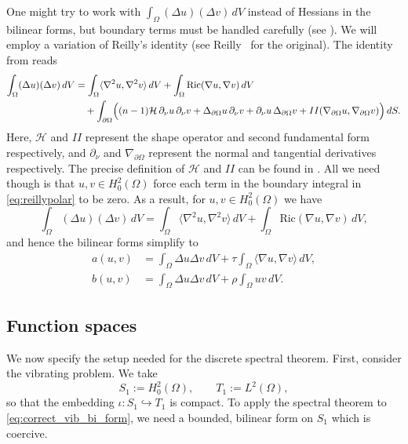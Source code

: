 \documentclass[11pt]{amsart}
\theoremstyle{definition}
\numberwithin{equation}{section}
\newcommand{\lapl}{\Delta}
\newcommand{\grad}{\nabla}
\begin{document}
One might try to work with $\int_{\Omega} (\Delta u)(\Delta v)\,dV$ instead of Hessians in the bilinear forms, but boundary terms must be handled carefully (see \cite[Remark 3.3]{CP22}). We will employ a variation of Reilly's identity (see Reilly~\cite{R77} for the original). The identity from \cite[Eq. 3.11]{CP22} reads
\begin{equation}\label{eq:reillypolar}
\begin{split}
\int_\Omega (\Delta u)(\Delta v)\,dV
&=
\int_\Omega \langle \nabla^2 u,\nabla^2 v\rangle\,dV
+\int_\Omega \text{Ric}(\nabla u,\nabla v)\,dV \\
&\quad
+\int_{\partial\Omega}
\Bigl(
(n-1)\mathcal{H}\,\partial_\nu u\,\partial_\nu v
+\Delta_{\partial\Omega}u\,\partial_\nu v
+\partial_\nu u\,\Delta_{\partial\Omega}v
+II(\nabla_{\partial\Omega}u,\nabla_{\partial\Omega}v)
\Bigr)\,dS.
\end{split}
\end{equation}
Here, $\mathcal{H}$ and $II$ represent the shape operator and second fundamental form respectively, and $\partial_\nu$ and $\grad_{\partial \Omega}$ represent the normal and tangential derivatives respectively. The precise definition of $\mathcal{H}$ and $II$ can be found in \cite{CP22}. All we need though is that $u,v \in H_0^2(\Omega)$ force each term in the boundary integral in \eqref{eq:reillypolar} to be zero. As a result, for $u ,v\in H_0^2(\Omega)$ we have
\[
\int_\Omega (\Delta u)(\Delta v)\,dV
=
\int_\Omega \langle \nabla^2 u,\nabla^2 v\rangle\,dV
+\int_\Omega \text{Ric}(\nabla u,\nabla v)\,dV,
\]
and hence the bilinear forms simplify to
\begin{align}
a(u,v)
&= \int_{\Omega} \lapl u \lapl v \, dV
   + \tau\int_{\Omega} \langle \nabla u,\nabla v\rangle \, dV, \label{eq:correct_vib_bi_form}
\\
b(u,v)
&= \int_{\Omega} \lapl u \lapl v \, dV
   + \rho\int_{\Omega} u v \, dV. \label{eq:correct_buc_bi_form}
\end{align}

\subsection*{Function spaces}

We now specify the setup needed for the discrete spectral theorem. First, consider the vibrating problem. We take
\[
S_1 := H^2_0(\Omega),\qquad T_1 := L^2(\Omega),
\]
so that the embedding $\iota:S_1\hookrightarrow T_1$ is compact. To apply the spectral theorem to \eqref{eq:correct_vib_bi_form}, we need a bounded, bilinear form on $S_1$ which is coercive.
\end{document}
